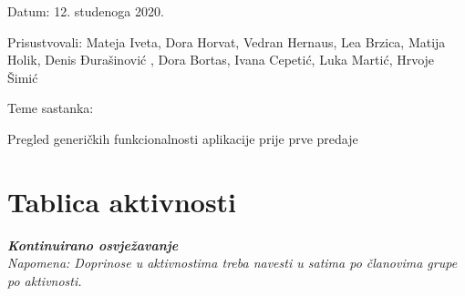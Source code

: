 \begin{packed_enum}
			\item[] \begin{packed_item}
				\item Datum: 12. studenoga 2020.
				\item Prisustvovali: Mateja Iveta, Dora Horvat, Vedran Hernaus, Lea Brzica, Matija Holik, Denis Đurašinović , Dora Bortas, Ivana Cepetić, Luka Martić, Hrvoje Šimić
				\item Teme sastanka:
				\begin{packed_item}
					\item Pregled generičkih funkcionalnosti aplikacije prije prve predaje
				\end{packed_item}
			\end{packed_item}
			
		\end{packed_enum}
		
		\eject
		\section*{Tablica aktivnosti}
		
			\textbf{\textit{Kontinuirano osvježavanje}}\\
			
			 \textit{Napomena: Doprinose u aktivnostima treba navesti u satima po članovima grupe po aktivnosti.}
					
						
			
